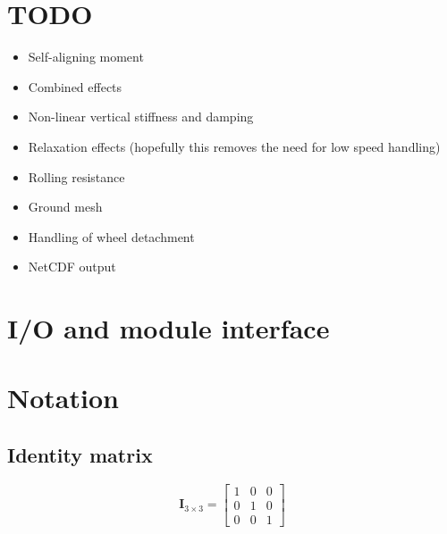 \section{TODO}
\begin{itemize}
    \item Self-aligning moment
    \item Combined effects
    \item Non-linear vertical stiffness and damping
    \item Relaxation effects (hopefully this removes the need for low speed handling)
    \item Rolling resistance
    \item Ground mesh
    \item Handling of wheel detachment
    \item NetCDF output
\end{itemize}

\section{I/O and module interface}


\section{Notation}
\subsection*{Identity matrix}
\begin{equation}
    \mathbf{I}_{3\times3} = \begin{bmatrix}
                                1 & 0 & 0 \\
                                0 & 1 & 0 \\
                                0 & 0 & 1
                            \end{bmatrix}
\end{equation}

